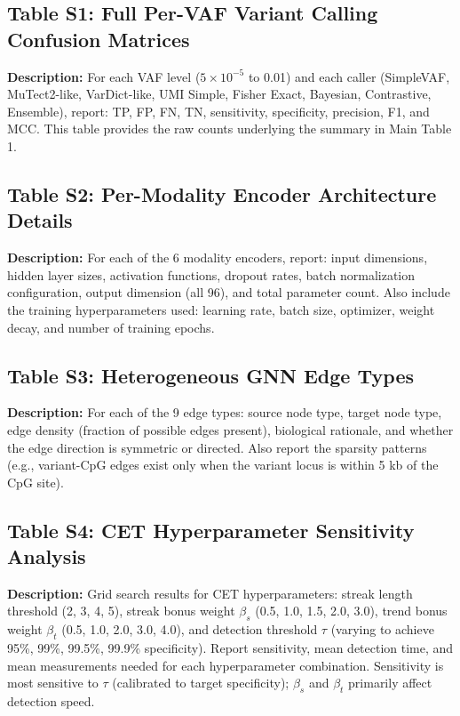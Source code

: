 \documentclass[10pt,a4paper]{article}
\begin{document}
\subsection*{Table S1: Full Per-VAF Variant Calling Confusion Matrices}
\textbf{Description:} For each VAF level ($5\times10^{-5}$ to 0.01) and each caller (SimpleVAF, MuTect2-like, VarDict-like, UMI Simple, Fisher Exact, Bayesian, Contrastive, Ensemble), report: TP, FP, FN, TN, sensitivity, specificity, precision, F1, and MCC. This table provides the raw counts underlying the summary in Main Table 1.

\subsection*{Table S2: Per-Modality Encoder Architecture Details}
\textbf{Description:} For each of the 6 modality encoders, report: input dimensions, hidden layer sizes, activation functions, dropout rates, batch normalization configuration, output dimension (all 96), and total parameter count. Also include the training hyperparameters used: learning rate, batch size, optimizer, weight decay, and number of training epochs.

\subsection*{Table S3: Heterogeneous GNN Edge Types}
\textbf{Description:} For each of the 9 edge types: source node type, target node type, edge density (fraction of possible edges present), biological rationale, and whether the edge direction is symmetric or directed. Also report the sparsity patterns (e.g., variant-CpG edges exist only when the variant locus is within 5 kb of the CpG site).

\subsection*{Table S4: CET Hyperparameter Sensitivity Analysis}
\textbf{Description:} Grid search results for CET hyperparameters: streak length threshold (2, 3, 4, 5), streak bonus weight $\beta_s$ (0.5, 1.0, 1.5, 2.0, 3.0), trend bonus weight $\beta_t$ (0.5, 1.0, 2.0, 3.0, 4.0), and detection threshold $\tau$ (varying to achieve 95\%, 99\%, 99.5\%, 99.9\% specificity). Report sensitivity, mean detection time, and mean measurements needed for each hyperparameter combination. Sensitivity is most sensitive to $\tau$ (calibrated to target specificity); $\beta_s$ and $\beta_t$ primarily affect detection speed.
\end{document}
